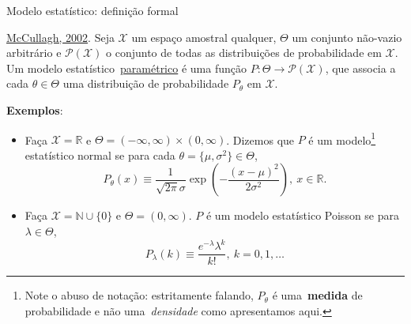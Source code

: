 \begin{frame}{Modelo estatístico: definição formal}
\begin{defn}
\label{def:statistical_model_formal}
\href{https://projecteuclid.org/download/pdf_1/euclid.aos/1035844977}{McCullagh, 2002}.
Seja $\mathcal{X}$ um espaço amostral qualquer, $\Theta$ um conjunto não-vazio arbitrário e $\mathcal{P}(\mathcal{X})$ o conjunto de todas as distribuições de probabilidade em $\mathcal{X}$.
 Um modelo estatístico~\underline{paramétrico} é uma função $P : \Theta \to \mathcal{P}(\mathcal{X})$, que associa a cada $\theta \in \Theta$ uma distribuição de probabilidade $P_\theta$ em $\mathcal{X}$.
\end{defn}
\textbf{Exemplos}:
\begin{itemize}
 \item Faça $\mathcal{X} = \mathbb{R}$ e $\Theta = (-\infty, \infty)\times (0, \infty)$.
 Dizemos que $P$ é um modelo\footnote{Note o abuso de notação: estritamente falando, $P_\theta$  é uma~\textbf{medida} de probabilidade e não uma~\textit{densidade} como apresentamos aqui.} estatístico normal se para cada $\theta = \{\mu, \sigma^2\} \in \Theta$,
 $$P_{\theta}(x) \equiv \frac{1}{\sqrt{2\pi}\sigma}\exp\left(-\frac{(x-\mu)^2}{2\sigma^2}\right), \: x \in \mathbb{R}.$$
 \item Faça $\mathcal{X} = \mathbb{N}\cup \{0\}$ e $\Theta = (0, \infty)$.
 $P$ é um modelo estatístico Poisson se para $\lambda \in \Theta$,
 $$P_{\lambda}(k) \equiv \frac{e^{-\lambda}\lambda^k}{k!}, \: k = 0, 1, \ldots$$
\end{itemize} 
\end{frame}


